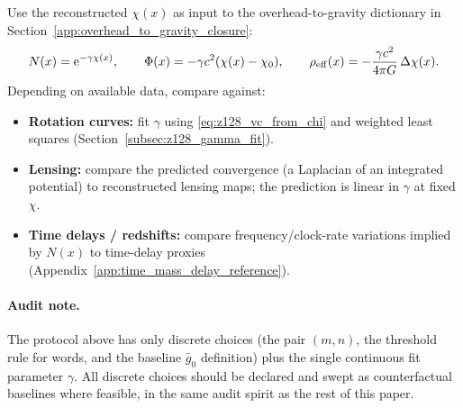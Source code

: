 Use the reconstructed $\chi(x)$ as input to the overhead-to-gravity dictionary in Section~\ref{app:overhead_to_gravity_closure}:
\[
N(x)=\mathrm{e}^{-\gamma\chi(x)},
\qquad
\Phi(x)= -\gamma c^2(\chi(x)-\chi_0),
\qquad
\rho_{\mathrm{eff}}(x)=-\frac{\gamma c^2}{4\pi G}\,\Delta\chi(x).
\]
Depending on available data, compare against:
\begin{itemize}
\item \textbf{Rotation curves:} fit $\gamma$ using \eqref{eq:z128_vc_from_chi} and weighted least squares (Section~\ref{subsec:z128_gamma_fit}).
\item \textbf{Lensing:} compare the predicted convergence (a Laplacian of an integrated potential) to reconstructed lensing maps; the prediction is linear in $\gamma$ at fixed $\chi$.
\item \textbf{Time delays / redshifts:} compare frequency/clock-rate variations implied by $N(x)$ to time-delay proxies (Appendix~\ref{app:time_mass_delay_reference}).
\end{itemize}

\paragraph{Audit note.}
\AuditTag The protocol above has only discrete choices (the pair $(m,n)$, the threshold rule for words, and the baseline $\bar g_0$ definition) plus the single continuous fit parameter $\gamma$.
All discrete choices should be declared and swept as counterfactual baselines where feasible, in the same audit spirit as the rest of this paper.


